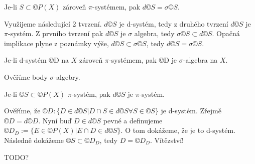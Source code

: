 \documentclass[12pt]{article}					%
\begin{document}
\begin{veta}[O rovnosti $d©S = \sigma©S$]
	Je-li $S \subset ©P(X)$ zároveň $\pi$-systémem, pak $d©S = \sigma©S$.

	\begin{dukazin}
		Využijeme následující 2 tvrzení. $d©S$ je d-systém, tedy z druhého tvrzení $d©S$ je $\pi$-systém. Z prvního tvrzení pak $d©S$ je $\sigma$ algebra, tedy $\sigma©S \subset d©S$. Opačná implikace plyne z poznámky výše, $d©S \subset \sigma©S$, tedy $d©S = \sigma ©S$.
	\end{dukazin}
\end{veta}

\begin{tvrzeni}
	Je-li d-systém ©D na $X$ zároveň $\pi$-systémem, pak ©D je $\sigma$-algebra na $X$.

	\begin{dukazin}
		Ověříme body $\sigma$-algebry.
	\end{dukazin}
\end{tvrzeni}

\begin{tvrzeni}
	Je-li $©S \subset ©P(X)$ $\pi$-systém, pak $d©S$ je $\pi$-systém.

	\begin{dukazin}
		Ověříme, že $©D: \{D \in d©S | D \cap S \in d©S \forall S \in ©S\}$ je d-systém. Zřejmě $©D = d©D$. Nyní buď $D \in d©S$ pevné a definujeme $©D_D := \{E \in ©P(X) | E \cap D \in d©S\}$. O tom dokážeme, že je to d-systém. Následně dokážeme $®S \subset ©D_D$, tedy $D = ©D_D$. Vítězství!
	\end{dukazin}
\end{tvrzeni}

TODO?
\end{document}
